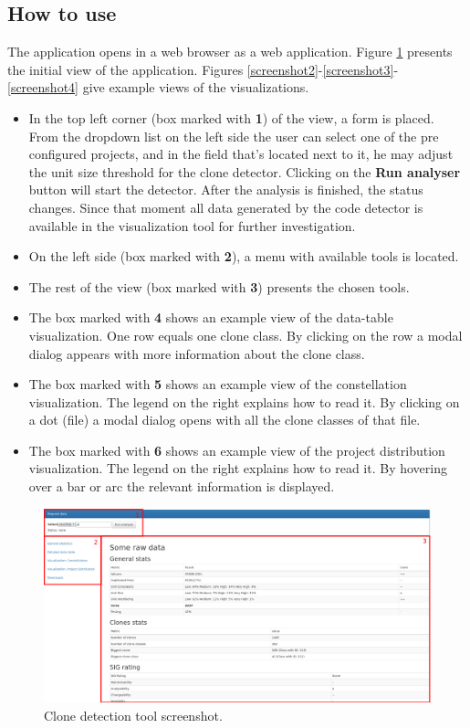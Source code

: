 \documentclass{uva-inf-article}
\begin{document}
\subsection{How to use}

The application opens in a web browser as a web application. Figure \ref{screenshot1} presents the initial view of the application. Figures \ref{screenshot2}-\ref{screenshot3}-\ref{screenshot4} give example views of the visualizations.

\begin{itemize}

\item{In the top left corner (box marked with \textbf{1}) of the view, a form is placed. From the dropdown list on the left side the user can select one of the pre configured projects, and in the field that's located next to it, he may adjust the unit size threshold for the clone detector. Clicking on the \textbf{Run analyser} button will start the detector. After the analysis is finished, the status changes. Since that moment all data generated by the code detector is available in the visualization tool for further investigation. }

\item{On the left side (box marked with \textbf{2}), a menu with available tools is located. }
\item{The rest of the view (box marked with \textbf{3}) presents the chosen tools. }
\item{The box marked with \textbf{4} shows an example view of the data-table visualization. One row equals one clone class. By clicking on the row a modal dialog appears with more information about the clone class.}
\item{The box marked with \textbf{5} shows an example view of the constellation visualization. The legend on the right explains how to read it. By clicking on a dot (file) a modal dialog opens with all the clone classes of that file. }
\item{The box marked with \textbf{6} shows an example view of the project distribution visualization. The legend on the right explains how to read it. By hovering over a bar or arc the relevant information is displayed.}
\end{itemize}

\begin{figure}[!htb]
	\includegraphics[width=\textwidth]{visualization1}
	\centering
	\caption{Clone detection tool screenshot.}
	\label{screenshot1}
\end{figure}
\end{document}
